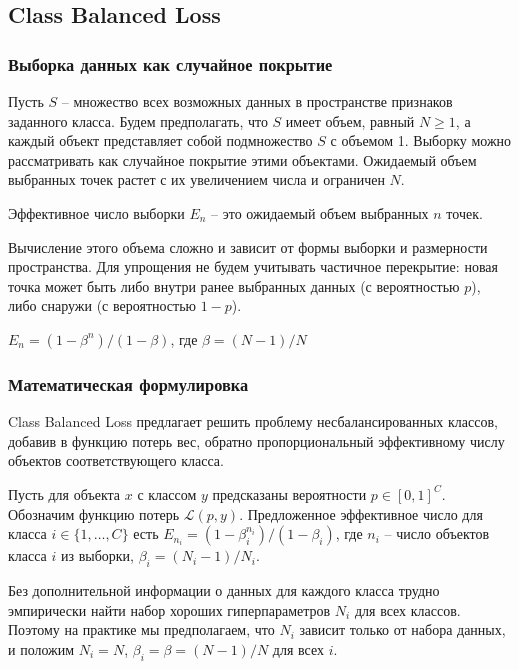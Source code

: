 \subsection*{Class Balanced Loss}

\subsubsection*{Выборка данных как случайное покрытие}

Пусть $S$ -- множество всех возможных данных в пространстве признаков заданного класса. Будем предполагать, что 
$S$ имеет объем, равный $N\ge1$, а каждый объект представляет собой подмножество $S$ с объемом 1. Выборку можно рассматривать как случайное покрытие этими объектами. Ожидаемый объем выбранных точек растет с их увеличением числа и ограничен $N$. 

\begin{definition}
    Эффективное число выборки $E_n$ -- это ожидаемый объем выбранных $n$ точек.
\end{definition}

Вычисление этого объема сложно и зависит от формы выборки и размерности пространства. Для упрощения не будем учитывать частичное перекрытие: новая точка может быть либо внутри ранее выбранных данных (с вероятностью $p$), либо снаружи (с вероятностью $1-p$).

\begin{proposition}
    $E_n=(1-\beta^n)/(1-\beta)$, где $\beta=(N-1)/N$
\end{proposition}

\subsubsection*{Математическая формулировка}

Class Balanced Loss предлагает решить проблему несбалансированных классов, добавив в функцию потерь вес, обратно пропорциональный эффективному числу объектов соответствующего класса. 

Пусть для объекта $x$ с классом $y$ предсказаны вероятности $p\in[0,1]^C$. Обозначим функцию потерь $\mathcal{L}(p,y)$. Предложенное эффективное число для класса $i\in\{1,\ldots,C\}$ есть $E_{n_i}=(1-\beta_i^{n_i})/(1-\beta_i)$, где $n_i$ -- число объектов класса $i$ из выборки, $\beta_i=(N_i-1)/N_i$.

Без дополнительной информации о данных для каждого класса трудно эмпирически найти набор хороших гиперпараметров $N_i$ для всех классов. Поэтому на практике мы предполагаем, что $N_i$ зависит только от набора данных, и положим $N_i = N$, $\beta_i = \beta = (N - 1)/N$ для всех $i$.

